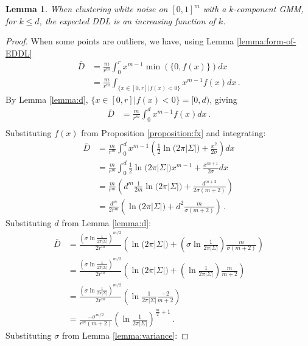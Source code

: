 \documentclass[a4paper,fleqn]{cas-sc}
\newtheorem{lemma}[theorem]{Lemma}
\theoremstyle{remark}
\begin{document}
\begin{lemma} \label{lemma:increasing-when-outliers}
When clustering white noise on $[0,1]^m$ with a $k$-component GMM, for $k \leq d$, the expected DDL is an increasing function of $k$. 
\end{lemma}
\begin{proof}
When some points are outliers, we have, using Lemma \ref{lemma:form-of-EDDL}
\begin{align*}
    \bar{D} &= \frac{m}{r^m}\int_0^r x^{m-1} \min(\{0,f(x)\}) dx \\
            &= \frac{m}{r^m}\int_{\{x \in [0,r] | f(x) < 0\}} x^{m-1} f(x) dx \,.
\end{align*}
By Lemma \ref{lemma:d}, $\{x \in [0,r] | f(x) < 0\} = [0,d)$, giving
\begin{align*}
     \bar{D} &= \frac{m}{r^m}\int_0^d x^{m-1} f(x) dx \,.\\
\end{align*}
Substituting $f(x)$ from Proposition \ref{proposition:fx} and integrating:
\begin{align*}
    \bar{D} &= \frac{m}{r^m}\int_0^d x^{m-1} \left(\frac{1}{2} \ln{(2\pi |\Sigma|}) + \frac{x^2}{2\sigma}\right)  dx \\
            &= \frac{m}{r^m}\int_0^d \frac{1}{2} \ln{(2\pi |\Sigma|})x^{m-1}  + \frac{x^{m+1}}{2\sigma}  dx \\
            &= \frac{m}{r^m} \left(d^{m} \frac{1}{2m} \ln{(2\pi |\Sigma|}) + \frac{d^{m+2}}{2\sigma(m+2)} \right) \\ 
            &= \frac{d^{m}}{2r^m}  \left(\ln{(2\pi |\Sigma|}) + d^{2}\frac{m}{\sigma(m+2)} \right) \,.
\end{align*}
Substituting $d$ from Lemma \ref{lemma:d}:
\begin{align*}
     \bar{D} &= \frac{(\sigma \ln{\frac{1}{2\pi |\Sigma|}})^{m/2}}{2r^m}  \left(\ln{(2\pi |\Sigma|}) + (\sigma \ln{\frac{1}{2\pi |\Sigma|}})\frac{m}{\sigma(m+2)} \right) \\
            &= \frac{(\sigma \ln{\frac{1}{2\pi |\Sigma|}})^{m/2}}{2r^m}  \left(\ln{(2\pi |\Sigma|}) + (\ln{\frac{1}{2\pi |\Sigma|}})\frac{m}{m+2} \right) \\
            &= \frac{(\sigma \ln{\frac{1}{2\pi |\Sigma|}})^{m/2}}{2r^m}  \left(\ln{\frac{1}{2\pi |\Sigma|}}\frac{-2}{m+2} \right) \\
            &= \frac{-\sigma ^{m/2}}{r^m(m+2)}  \left(\ln{\frac{1}{2\pi |\Sigma|}} \right)^{\frac{m}{2}+1} \,.
\end{align*}
Substituting $\sigma$ from Lemma \ref{lemma:variance}:

\end{proof}
\end{document}
